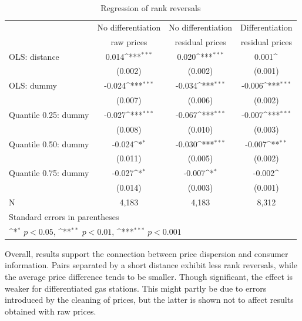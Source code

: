 \documentclass[11pt]{article}
\begin{document}
\begin{table}[h]\centering
\def\sym#1{\ifmmode^{#1}\else\(^{#1}\)\fi}
\caption{Regression of rank reversals}
\begin{tabular}{lccc}
\hline
\hline
{} & No differentiation & No differentiation & Differentiation \\
{} & raw prices & residual prices & residual prices \\
\hline
OLS: distance             &  0.014\sym{***}  &  0.020\sym{***}  &  0.001\sym{}\\
{}                        & (0.002)          & (0.002)          & (0.001)   \\
OLS: dummy                & -0.024\sym{***}  & -0.034\sym{***}  & -0.006\sym{***}\\
{}                        & (0.007)          & (0.006)          & (0.002) \\
Quantile 0.25: dummy      & -0.027\sym{***}  & -0.067\sym{***}  & -0.007\sym{***}\\
{}                        & (0.008)          & (0.010)          & (0.003)  \\
Quantile 0.50: dummy      & -0.024\sym{*}    & -0.030\sym{***}  & -0.007\sym{**}\\
{}                        & (0.011)          & (0.005)          & (0.002)    \\
Quantile 0.75: dummy      & -0.027\sym{*}    & -0.007\sym{*}    & -0.002\sym{}\\
{}                        & (0.014)          & (0.003)          & (0.001)   \\
\hline
N                         & 4,183            &   4,183          &     8,312    \\
\hline\hline
\multicolumn{4}{l}{\footnotesize Standard errors in parentheses}\\
\multicolumn{4}{l}{\footnotesize \sym{*} \(p<0.05\), \sym{**} \(p<0.01\), \sym{***} \(p<0.001\)}\\
\end{tabular}
\end{table}

Overall, results support the connection between price dispersion and consumer information. Pairs separated by a short distance exhibit less rank reversals, while the average price difference tends to be smaller. Though significant, the effect is weaker for differentiated gas stations. This might partly be due to errors introduced by the cleaning of prices, but the latter is shown not to affect results obtained with raw prices.
\end{document}
